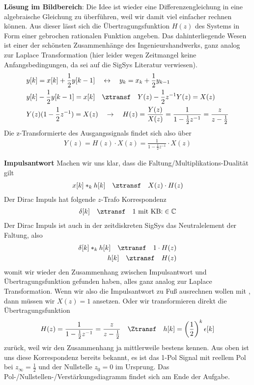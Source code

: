 \begin{ExCalc}
\textbf{Lösung im Bildbereich}:
Die Idee ist wieder eine Differenzengleichung in eine algebraische Gleichung zu überführen,
weil wir damit viel einfacher rechnen können.
Aus dieser lässt sich die Übertragungsfunktion $H(z)$ des Systems in Form einer
gebrochen rationalen Funktion angeben. Das dahinterliegende Wesen ist einer der
schönsten Zusammenhänge des Ingenieurshandwerks, ganz analog zur Laplace
Transformation (hier leider wegen Zeitmangel keine Anfangsbedingungen,
da sei auf die SigSys Literatur verwiesen).
\begin{align}
&y[k] = x[k] + \frac{1}{2} y[k-1] \quad\leftrightarrow\quad y_k = x_k + \frac{1}{2} y_{k-1}\\
&y[k] - \frac{1}{2} y[k-1] = x[k] \quad\ztransf\quad Y(z) - \frac{1}{2} z^{-1} Y(z) = X(z)\\
&Y(z) (1-\frac{1}{2} z^{-1}) = X(z) \quad\rightarrow\quad H(z) = \frac{Y(z)}{X(z)} =
\frac{1}{1-\frac{1}{2} z^{-1}} = \frac{z}{z-\frac{1}{2}}
\end{align}
Die z-Transformierte des Ausgangssignals findet sich also über
\begin{align}
\label{eq:Y_HX_zTrafo_A1D74A9E5B}
Y(z) = H(z) \cdot X(z) = \frac{1}{1-\frac{1}{2} z^{-1}} \cdot X(z)
\end{align}

\textbf{Impulsantwort}
Machen wir uns klar, dass die Faltung/Multiplikations-Dualität gilt
\begin{align}
x[k] \ast_k h[k] \quad\ztransf\quad X(z) \cdot H(z)
\end{align}
Der Dirac Impuls hat folgende $z$-Trafo Korrespondenz
\begin{align}
\delta[k] \quad\ztransf\quad 1\text{ mit KB:} \in\mathbb{C}
\end{align}
Der Dirac Impuls ist auch in der zeitdiskreten SigSys das Neutralelement der Faltung,
also
\begin{align}
\delta[k] \ast_k h[k] \quad\ztransf\quad 1 \cdot H(z)\\
h[k] \quad\ztransf\quad H(z)
\end{align}
womit wir wieder den Zusammenhang zwischen Impulsantwort und Übertragungsfunktion
gefunden haben, alles ganz analog zur Laplace Transformation.
%
Wenn wir also die Impulsantwort zu Fuß ausrechnen wollen
mit , dann müssen wir $X(z)=1$ ansetzen.
%
Oder wir transformieren direkt die Übertragungsfunktion
\begin{align}
H(z) = \frac{1}{1-\frac{1}{2} z^{-1}} = \frac{z}{z-\frac{1}{2}}
\quad\Ztransf\quad
h[k] = \left(\frac{1}{2}\right)^k \epsilon[k]
\end{align}
zurück, weil wir den Zusammenhang ja mittlerweile bestens kennen.
Aus  oben ist uns diese Korrespondenz
bereits bekannt, es ist das 1-Pol Signal mit reellem Pol bei $z_\infty=\frac{1}{2}$ und
der Nullstelle $z_0 = 0$ im Ursprung. Das Pol-/Nullstellen-/Verstärkungsdiagramm
findet sich am Ende der Aufgabe.


\end{ExCalc}
